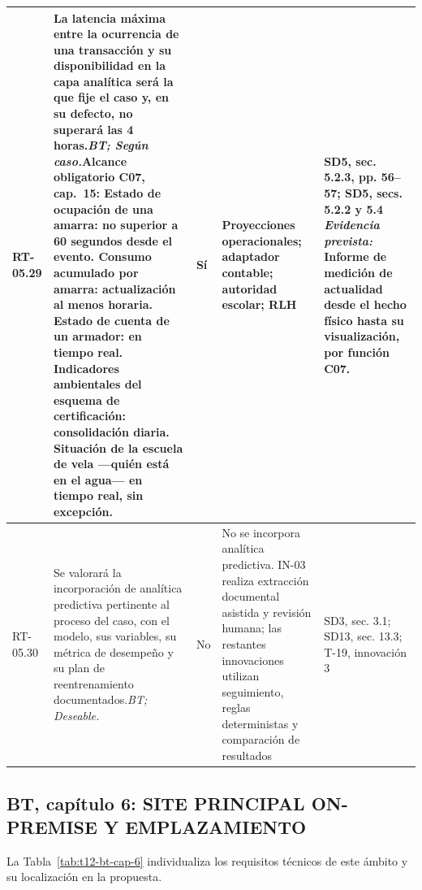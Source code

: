 \begin{paginaHorizontalSynaptix}
\begin{longtable}{|L{0.09\AnchoMatrizTDoce}|L{0.385\AnchoMatrizTDoce}|L{0.065\AnchoMatrizTDoce}|L{0.18\AnchoMatrizTDoce}|L{0.28\AnchoMatrizTDoce}|}
RT-\allowbreak{}05.\allowbreak{}29 &
La latencia máxima entre la ocurrencia de una transacción y su disponibilidad en la capa analítica será la que fije el caso y, en su defecto, no superará las 4 horas.\newline\textit{BT; Según caso.}\newline\textbf{Alcance obligatorio C07, cap.~15:} Estado de ocupación de una amarra: no superior a 60 segundos desde el evento. Consumo acumulado por amarra: actualización al menos horaria. Estado de cuenta de un armador: en tiempo real. Indicadores ambientales del esquema de certificación: consolidación diaria. Situación de la escuela de vela —quién está en el agua— en tiempo real, sin excepción. &
Sí &
Proyecciones operacionales; adaptador contable; autoridad escolar; RLH &
SD5, sec. 5.2.3, pp. 56--57; SD5, secs. 5.2.2 y 5.4 \newline\textit{Evidencia prevista:} Informe de medición de actualidad desde el hecho físico hasta su visualización, por función C07. \\ \hline

RT-\allowbreak{}05.\allowbreak{}30 &
Se valorará la incorporación de analítica predictiva pertinente al proceso del caso, con el modelo, sus variables, su métrica de desempeño y su plan de reentrenamiento documentados.\newline\textit{BT; Deseable.} &
No &
No se incorpora analítica predictiva. IN-03 realiza extracción documental asistida y revisión humana; las restantes innovaciones utilizan seguimiento, reglas deterministas y comparación de resultados &
SD3, sec. 3.1; SD13, sec. 13.3; T-19, innovación 3 \\ \hline

\end{longtable}


\subsection*{BT, capítulo 6: SITE PRINCIPAL ON-PREMISE Y EMPLAZAMIENTO}


La Tabla~\ref{tab:t12-bt-cap-6} individualiza los requisitos técnicos de este ámbito y su localización en la propuesta.

\begin{longtable}{|L{0.09\AnchoMatrizTDoce}|L{0.385\AnchoMatrizTDoce}|L{0.065\AnchoMatrizTDoce}|L{0.18\AnchoMatrizTDoce}|L{0.28\AnchoMatrizTDoce}|}


\end{longtable}
\end{paginaHorizontalSynaptix}

